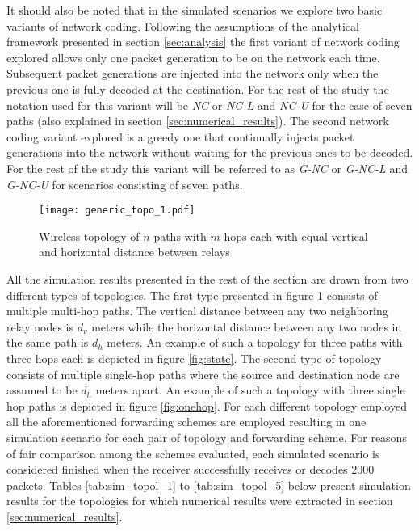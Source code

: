\documentclass[journal, onecolumn, 12pt]{IEEEtran}
\begin{document}
It should also be noted that in the simulated scenarios we explore two basic variants of network coding.
Following the assumptions of the analytical framework presented in section \ref{sec:analysis} the first variant
of network coding explored allows only one packet generation to be on the network each time.
Subsequent packet generations are injected into the network only when the previous one is fully decoded at the destination.
For the rest of the study the notation used for this variant will be \textit{NC} or \textit{NC-L} and \textit{NC-U} for the case of seven paths (also explained in section \ref{sec:numerical_results}).
The second network coding variant explored is a greedy one that continually injects packet generations into the network without waiting for the previous ones to be decoded.
For the rest of the study this variant will be referred to as \textit{G-NC} or \textit{G-NC-L} and \textit{G-NC-U} for scenarios consisting of seven paths.

\begin{figure}
\begin{center}
\texttt{[image: generic\_topo\_1.pdf]}
\caption{Wireless topology of $n$ paths with $m$ hops each with equal vertical and horizontal distance between relays}
\label{fig:generic_topo_1}
\end{center}
\end{figure}

All the simulation results presented in the rest of the section are drawn from two different types of topologies.
The first type presented in figure \ref{fig:generic_topo_1} consists of multiple multi-hop paths.
The vertical distance between any two neighboring relay nodes is $d_{v}$ meters while the horizontal distance between any two nodes in the same path is $d_{h}$ meters.
An example of such a topology for three paths with three hops each is depicted in figure \ref{fig:state}.
The second type of topology consists of multiple single-hop paths where the source and destination node are assumed to be $d_{h}$ meters apart.
An example of such a topology with three single hop paths is depicted in figure \ref{fig:onehop}.
For each different topology employed all the aforementioned forwarding schemes are employed resulting in one simulation scenario for each pair of
topology and forwarding scheme.
For reasons of fair comparison among the schemes evaluated, each simulated scenario is considered finished when the receiver successfully receives or decodes $2000$ packets.
Tables \ref{tab:sim_topol_1} to \ref{tab:sim_topol_5} below present simulation results for the topologies for which numerical results were extracted in section \ref{sec:numerical_results}.
\end{document}
